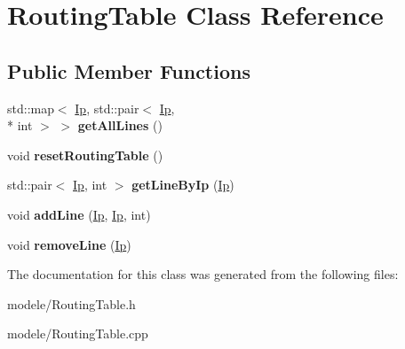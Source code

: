 \hypertarget{class_routing_table}{\section{Routing\-Table Class Reference}
\label{class_routing_table}
}
\subsection*{Public Member Functions}
\begin{DoxyCompactItemize}
\item 
\hypertarget{class_routing_table_a4362171a300ba0b88760c7e7e64f686b}{std\-::map$<$ \hyperlink{class_ip}{Ip}, std\-::pair$<$ \hyperlink{class_ip}{Ip}, \\*
int $>$ $>$ {\bfseries get\-All\-Lines} ()}\label{class_routing_table_a4362171a300ba0b88760c7e7e64f686b}

\item 
\hypertarget{class_routing_table_a611af0c36a9d03ce17698cbb2e9b2542}{void {\bfseries reset\-Routing\-Table} ()}\label{class_routing_table_a611af0c36a9d03ce17698cbb2e9b2542}

\item 
\hypertarget{class_routing_table_a7c95543f5564c72b335c6911419147d2}{std\-::pair$<$ \hyperlink{class_ip}{Ip}, int $>$ {\bfseries get\-Line\-By\-Ip} (\hyperlink{class_ip}{Ip})}\label{class_routing_table_a7c95543f5564c72b335c6911419147d2}

\item 
\hypertarget{class_routing_table_a831bc1b90e4ccde2e36b391372974c33}{void {\bfseries add\-Line} (\hyperlink{class_ip}{Ip}, \hyperlink{class_ip}{Ip}, int)}\label{class_routing_table_a831bc1b90e4ccde2e36b391372974c33}

\item 
\hypertarget{class_routing_table_acf6b8a537e9b62524e2dd05e3c6872b5}{void {\bfseries remove\-Line} (\hyperlink{class_ip}{Ip})}\label{class_routing_table_acf6b8a537e9b62524e2dd05e3c6872b5}

\end{DoxyCompactItemize}


The documentation for this class was generated from the following files\-:\begin{DoxyCompactItemize}
\item 
modele/Routing\-Table.\-h\item 
modele/Routing\-Table.\-cpp\end{DoxyCompactItemize}
